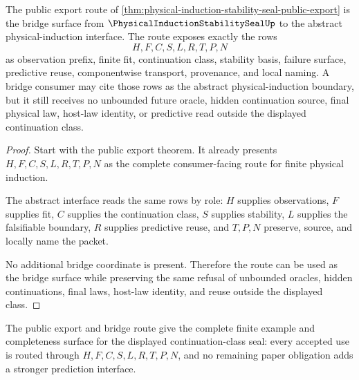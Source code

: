 \begin{theorem}
\label{thm:physical-induction-stability-seal-bridge-route}
The public export route of \autoref{thm:physical-induction-stability-seal-public-export} is the bridge surface from $\PhysicalInductionStabilitySealUp$ to the abstract physical-induction interface. The route exposes exactly the rows
$$
H,F,C,S,L,R,T,P,N
$$
as observation prefix, finite fit, continuation class, stability basis, failure surface, predictive reuse, componentwise transport, provenance, and local naming. A bridge consumer may cite those rows as the abstract physical-induction boundary, but it still receives no unbounded future oracle, hidden continuation source, final physical law, host-law identity, or predictive read outside the displayed continuation class.
\end{theorem}
\begin{proof}
Start with the public export theorem. It already presents $H,F,C,S,L,R,T,P,N$ as the complete consumer-facing route for finite physical induction.

The abstract interface reads the same rows by role: $H$ supplies observations, $F$ supplies fit, $C$ supplies the continuation class, $S$ supplies stability, $L$ supplies the falsifiable boundary, $R$ supplies predictive reuse, and $T,P,N$ preserve, source, and locally name the packet.

No additional bridge coordinate is present. Therefore the route can be used as the bridge surface while preserving the same refusal of unbounded oracles, hidden continuations, final laws, host-law identity, and reuse outside the displayed class.
\end{proof}

The public export and bridge route give the complete finite example and completeness surface for the displayed continuation-class seal: every accepted use is routed through $H,F,C,S,L,R,T,P,N$, and no remaining paper obligation adds a stronger prediction interface.



